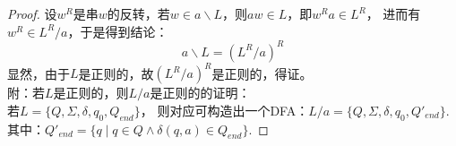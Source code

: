 \begin{proof}
    设$w^R$是串$w$的反转，若$w \in a\backslash L$，则$aw \in L$，即$w^Ra \in L^R$，
    进而有$w^R \in L^R/a$，于是得到结论：
    $$a\backslash L = (L^R/a)^R$$
    显然，由于$L$是正则的，故$(L^R/a)^R$是正则的，得证。\\
    \bigskip
    附：若$L$是正则的，则$L/a$是正则的的证明：\\
    若$L=\{Q,\Sigma,\delta,q_0,Q_{end}\}$，
    则对应可构造出一个DFA：$L/a=\{Q,\Sigma,\delta,q_0,Q'_{end}\}$.
    其中：$Q'_{end}=\{ q \mid q\in Q \wedge \delta(q,a)\in Q_{end} \}$.
\end{proof}